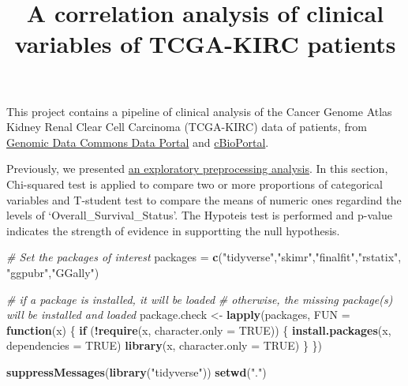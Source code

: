 \documentclass[]{article}
\title{A correlation analysis of clinical variables of TCGA-KIRC patients}
\author{}
\date{\vspace{-2.5em}}
\newenvironment{Shaded}{\begin{snugshade}}{\end{snugshade}}
\newcommand{\KeywordTok}[1]{\textcolor[rgb]{0.13,0.29,0.53}{\textbf{#1}}}
\newcommand{\DataTypeTok}[1]{\textcolor[rgb]{0.13,0.29,0.53}{#1}}
\newcommand{\StringTok}[1]{\textcolor[rgb]{0.31,0.60,0.02}{#1}}
\newcommand{\CommentTok}[1]{\textcolor[rgb]{0.56,0.35,0.01}{\textit{#1}}}
\newcommand{\OtherTok}[1]{\textcolor[rgb]{0.56,0.35,0.01}{#1}}
\newcommand{\ControlFlowTok}[1]{\textcolor[rgb]{0.13,0.29,0.53}{\textbf{#1}}}
\newcommand{\OperatorTok}[1]{\textcolor[rgb]{0.81,0.36,0.00}{\textbf{#1}}}
\newcommand{\NormalTok}[1]{#1}
\begin{document}
\maketitle

This project contains a pipeline of clinical analysis of the Cancer
Genome Atlas Kidney Renal Clear Cell Carcinoma (TCGA-KIRC) data of
patients, from
\href{https://portal.gdc.cancer.gov/exploration?filters=\%7B\%22op\%22\%3A\%22and\%22\%2C\%22content\%22\%3A\%5B\%7B\%22op\%22\%3A\%22in\%22\%2C\%22content\%22\%3A\%7B\%22field\%22\%3A\%22cases.project.project_id\%22\%2C\%22value\%22\%3A\%5B\%22TCGA-KIRC\%22\%5D\%7D\%7D\%5D\%7D}{Genomic
Data Commons Data Portal} and
\href{https://www.cbioportal.org/study/summary?id=kirp_tcga}{cBioPortal}.

Previously, we presented \href{1.preprocessing.md}{an exploratory
preprocessing analysis}. In this section, Chi-squared test is applied to
compare two or more proportions of categorical variables and T-student
test to compare the means of numeric ones regardind the levels of
`Overall\_Survival\_Status'. The Hypoteis test is performed and p-value
indicates the strength of evidence in supportting the null hypothesis.

\begin{Shaded}
\begin{Highlighting}[]
\CommentTok{# Set the packages of interest}
\NormalTok{packages =}\StringTok{ }\KeywordTok{c}\NormalTok{(}\StringTok{"tidyverse"}\NormalTok{,}\StringTok{"skimr"}\NormalTok{,}\StringTok{"finalfit"}\NormalTok{,}\StringTok{"rstatix"}\NormalTok{, }\StringTok{"ggpubr"}\NormalTok{,}\StringTok{"GGally"}\NormalTok{)}

\CommentTok{# if a package is installed, it will be loaded}
\CommentTok{# otherwise, the missing package(s) will be installed and loaded}
\NormalTok{package.check <-}\StringTok{ }\KeywordTok{lapply}\NormalTok{(packages, }\DataTypeTok{FUN =} \ControlFlowTok{function}\NormalTok{(x) \{}
  \ControlFlowTok{if}\NormalTok{ (}\OperatorTok{!}\KeywordTok{require}\NormalTok{(x, }\DataTypeTok{character.only =} \OtherTok{TRUE}\NormalTok{)) \{}
    \KeywordTok{install.packages}\NormalTok{(x, }\DataTypeTok{dependencies =} \OtherTok{TRUE}\NormalTok{)}
    \KeywordTok{library}\NormalTok{(x, }\DataTypeTok{character.only =} \OtherTok{TRUE}\NormalTok{)}
\NormalTok{  \}}
\NormalTok{\})}

\KeywordTok{suppressMessages}\NormalTok{(}\KeywordTok{library}\NormalTok{(}\StringTok{"tidyverse"}\NormalTok{))}
\KeywordTok{setwd}\NormalTok{(}\StringTok{"."}\NormalTok{)}
\end{Highlighting}
\end{Shaded}
\end{document}
